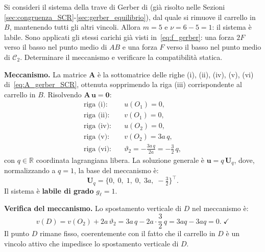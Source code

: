 \begin{esempio}
	\label{ex:gerber_labile}
	Si consideri il sistema della trave di Gerber di
	 (già risolto nelle Sezioni
	\ref{sec:congruenza_SCR}-\ref{sec:gerber_equilibrio}),
	dal quale si rimuove il carrello in $B$, mantenendo tutti gli
	altri vincoli. Allora $m = 5$ e $\nu = 6 - 5 = 1$: il sistema è
	labile. Sono applicati gli stessi carichi già visti
	in~\eqref{eq:f_gerber}: una forza $2F$ verso il
	basso nel punto medio di $AB$ e una forza $F$ verso
	il basso nel punto medio di $\mathcal{C}_2$.
	Determinare il meccanismo e verificare la
	compatibilità statica.
	
	\begin{svolgimento}
		
		\noindent\textbf{Meccanismo.}
		La matrice $\bm{A}$ è la sottomatrice delle righe
		(i), (ii), (iv), (v), (vi) di~\eqref{eq:A_gerber_SCR},
		ottenuta sopprimendo la riga (iii) corrispondente al
		carrello in $B$. Risolvendo $\bm{A}\,\bm{u} = \bm{0}$:
		\begin{align*}
			\text{riga (i):}&\quad u(O_1) = 0,\\
			\text{riga (ii):}&\quad v(O_1) = 0,\\
			\text{riga (iv):}&\quad u(O_2) = 0,\\
			\text{riga (v):}&\quad v(O_2) = 3a\,q,\\
			\text{riga (vi):}&\quad
			\vartheta_2 = -\frac{3a\,q}{2a}
			= -\frac{3}{2}\,q,
		\end{align*}
		con $q \in \mathbb{R}$ coordinata lagrangiana libera.
		La soluzione generale è $\bm{u} = q\,\bm{U}_q$,
		dove, normalizzando a $q = 1$, la base del meccanismo
		è:
		\begin{equation*}
			\bm{U}_q =
			\bigl\{0,\; 0,\; 1,\; 0,\; 3a,\;
			-\tfrac{3}{2}
			\bigr\}^\top.
		\end{equation*}
		Il sistema è \textbf{labile di grado} $g_\ell = 1$.
		
		\noindent\textbf{Verifica del meccanismo.}
		Lo spostamento verticale di $D$ nel meccanismo è:
		\begin{equation*}
			v(D) = v(O_2) + 2a\,\vartheta_2
			= 3a\,q - 2a\cdot\frac{3}{2}\,q
			= 3aq - 3aq = 0. \;\checkmark
		\end{equation*}
		Il punto $D$ rimane fisso, coerentemente con il
		fatto che il carrello in $D$ è un vincolo attivo
		che impedisce lo spostamento verticale di $D$.
		

\end{svolgimento}
\end{esempio}

